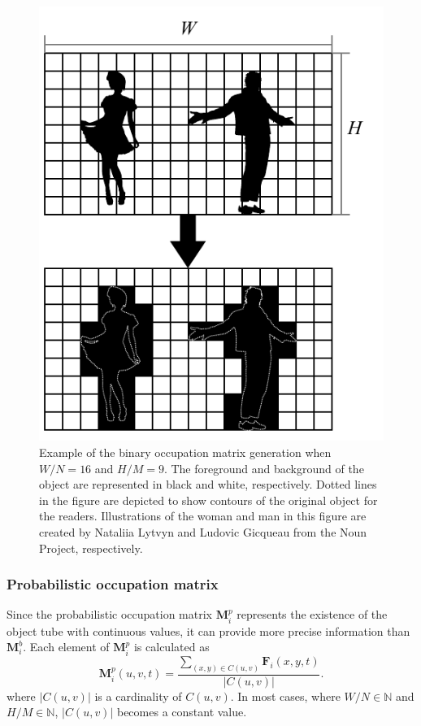 \documentclass[11pt]{hyu_thesis}
\begin{document}
\begin{figure}
	\begin{center}
		\includegraphics[width=0.7\linewidth]{bin-occ.pdf}
	\end{center}
	\caption{Example of the binary occupation matrix generation when $W/N=16$ and $H/M=9$. The foreground and background of the object are represented in black and white, respectively. Dotted lines in the figure are depicted to show contours of the original object for the readers. Illustrations of the woman and man in this figure are created by Nataliia Lytvyn and Ludovic Gicqueau from the Noun Project, respectively.}
	\label{fig:bin_occ}
\end{figure}

\subsubsection{Probabilistic occupation matrix}
\label{sec:proposed:occ:prob}
Since the probabilistic occupation matrix $\textbf{M}_i^p$ represents the existence of the object tube with continuous values, it can provide more precise information than $\textbf{M}_i^b$. Each element of $\textbf{M}_i^p$ is calculated as
\begin{equation}
\label{eq:prob_occ}
\textbf{M}_i^p(u,v,t)= \frac{\sum_{(x,y) \in C(u,v)}\textbf{F}_i(x,y,t)}{|C(u,v)|}.
\end{equation}
where $|C(u,v)|$ is a cardinality of $C(u,v)$. In most cases, where $W/N \in \mathbb{N}$ and $H/M \in \mathbb{N}$, $|C(u,v)|$ becomes a constant value.
\end{document}
